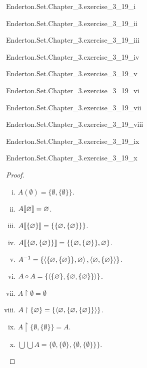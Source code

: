 \documentclass{report}
\begin{document}
    {Enderton.Set.Chapter\_3.exercise\_3\_19\_i}

    {Enderton.Set.Chapter\_3.exercise\_3\_19\_ii}

    {Enderton.Set.Chapter\_3.exercise\_3\_19\_iii}

    {Enderton.Set.Chapter\_3.exercise\_3\_19\_iv}

    {Enderton.Set.Chapter\_3.exercise\_3\_19\_v}

    {Enderton.Set.Chapter\_3.exercise\_3\_19\_vi}

    {Enderton.Set.Chapter\_3.exercise\_3\_19\_vii}

    {Enderton.Set.Chapter\_3.exercise\_3\_19\_viii}

    {Enderton.Set.Chapter\_3.exercise\_3\_19\_ix}

    {Enderton.Set.Chapter\_3.exercise\_3\_19\_x}

  \begin{proof}
    \begin{enumerate}[(i)]
      \item $A(\emptyset) = \{\emptyset, \{\emptyset\}\}$.
      \item $A\!\left\llbracket\varnothing\right\rrbracket = \varnothing$.
      \item $A\!\left\llbracket\{\varnothing\}\right\rrbracket = \{\{\varnothing, \{\varnothing\}\}\}$.
      \item $A\!\left\llbracket\{\varnothing, \{\varnothing\}\}\right\rrbracket =
        \{\{\varnothing, \{\varnothing\}\}, \varnothing\}$.
      \item $A^{-1} = \{
        \left< \{\varnothing, \{\varnothing\}\}, \varnothing \right>,
        \left< \varnothing, \{\varnothing\} \right>
      \}$.
      \item $A \circ A =
        \{\left< \{\varnothing\}, \{\varnothing, \{\varnothing\}\} \right>\}$.
      \item $A \restriction \emptyset = \emptyset$
      \item $A \restriction \{\varnothing\} =
        \{\left< \varnothing, \{\varnothing, \{\varnothing\}\} \right>\}$.
      \item $A \restriction \{\emptyset, \{\emptyset\}\} = A$.
      \item $\bigcup\bigcup A =
        \{\emptyset, \{\emptyset\}, \{\emptyset, \{\emptyset\}\}\}$.
    \end{enumerate}
  \end{proof}
\end{document}
